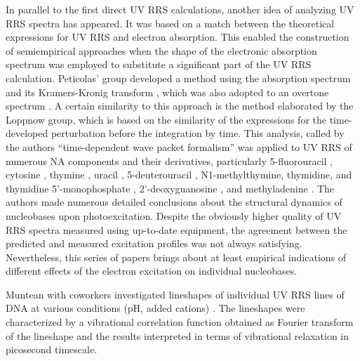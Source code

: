 In parallel to the first direct UV RRS calculations, another idea of analyzing
UV RRS spectra has appeared.
It was based on a match between the theoretical expressions for UV RRS and
electron absorption.
This enabled the construction of semiempirical approaches when the shape of the
electronic absorption spectrum was employed to substitute a significant part of
the UV RRS calculation.
Peticolas' group developed a method using the absorption spectrum and its
Kramers-Kronig transform
\parencite{Blazej1980},
which was also adopted to an overtone spectrum
\parencite{Chinsky1982a}.
A certain similarity to this approach is the method elaborated by the Loppnow
group, which is based on the similarity of the expressions for the
time-developed perturbation before the integration by time.
This analysis, called by the authors “time-dependent wave packet formalism” was
applied to UV RRS of numerous NA components and their derivatives, particularly
5-fluorouracil
\parencite{Billinghurst2006a},
cytosine
\parencite{Billinghurst2006},
thymine
\parencite{Yarasi2007},
uracil
\parencite{Yarasi2009},
5-deuterouracil
\parencite{Ng2011},
N1-methylthymine, thymidine, and thymidine 5'-monophosphate
\parencite{Billinghurst2012},
2'-deoxyguanosine
\parencite{El-Yazbi2011},
and methyladenine
\parencite{Oladepo2011}.
The authors made numerous detailed conclusions about the structural dynamics of
nucleobases upon photoexcitation.
Despite the obviously higher quality of UV RRS spectra measured using
up-to-date equipment, the agreement between the predicted and measured
excitation profiles was not always satisfying.
Nevertheless, this series of papers brings about at least empirical indications
of different effects of the electron excitation on individual nucleobases.

Muntean with coworkers investigated lineshapes of individual UV RRS lines of
DNA at various conditions (pH, added cations)
\parencite{%
	Muntean2017,%
	Muntean2020%
}.
The lineshapes were characterized by a vibrational correlation function
obtained as Fourier transform of the lineshape and the results interpreted in
terms of vibrational relaxation in picosecond timescale.
